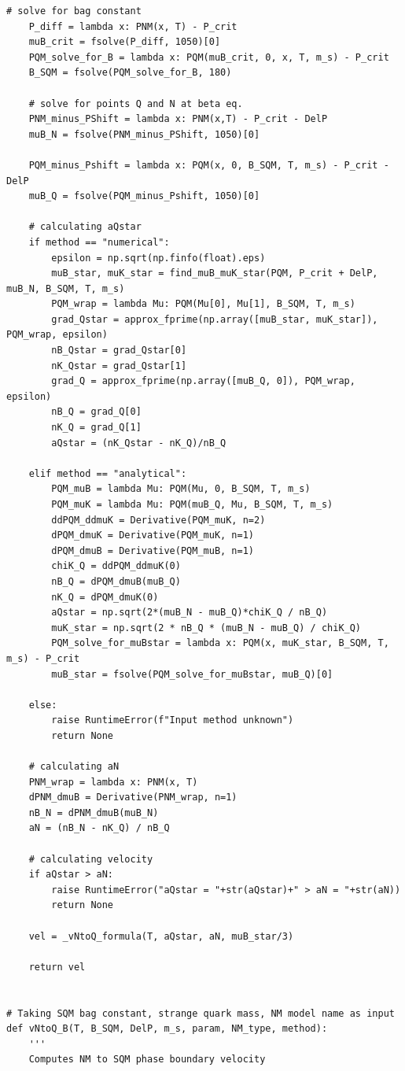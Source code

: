 \documentclass[12pt]{article}
\begin{document}
\begin{lstlisting}[style=mypython]
    # solve for bag constant
    P_diff = lambda x: PNM(x, T) - P_crit
    muB_crit = fsolve(P_diff, 1050)[0]
    PQM_solve_for_B = lambda x: PQM(muB_crit, 0, x, T, m_s) - P_crit
    B_SQM = fsolve(PQM_solve_for_B, 180)

    # solve for points Q and N at beta eq.
    PNM_minus_PShift = lambda x: PNM(x,T) - P_crit - DelP
    muB_N = fsolve(PNM_minus_PShift, 1050)[0]

    PQM_minus_Pshift = lambda x: PQM(x, 0, B_SQM, T, m_s) - P_crit - DelP
    muB_Q = fsolve(PQM_minus_Pshift, 1050)[0]

    # calculating aQstar
    if method == "numerical":
        epsilon = np.sqrt(np.finfo(float).eps)
        muB_star, muK_star = find_muB_muK_star(PQM, P_crit + DelP, muB_N, B_SQM, T, m_s)
        PQM_wrap = lambda Mu: PQM(Mu[0], Mu[1], B_SQM, T, m_s)
        grad_Qstar = approx_fprime(np.array([muB_star, muK_star]), PQM_wrap, epsilon)
        nB_Qstar = grad_Qstar[0]
        nK_Qstar = grad_Qstar[1]
        grad_Q = approx_fprime(np.array([muB_Q, 0]), PQM_wrap, epsilon)
        nB_Q = grad_Q[0]
        nK_Q = grad_Q[1]
        aQstar = (nK_Qstar - nK_Q)/nB_Q  
 
    elif method == "analytical":
        PQM_muB = lambda Mu: PQM(Mu, 0, B_SQM, T, m_s)
        PQM_muK = lambda Mu: PQM(muB_Q, Mu, B_SQM, T, m_s)
        ddPQM_ddmuK = Derivative(PQM_muK, n=2)
        dPQM_dmuK = Derivative(PQM_muK, n=1)
        dPQM_dmuB = Derivative(PQM_muB, n=1)
        chiK_Q = ddPQM_ddmuK(0)
        nB_Q = dPQM_dmuB(muB_Q)
        nK_Q = dPQM_dmuK(0)
        aQstar = np.sqrt(2*(muB_N - muB_Q)*chiK_Q / nB_Q)
        muK_star = np.sqrt(2 * nB_Q * (muB_N - muB_Q) / chiK_Q)
        PQM_solve_for_muBstar = lambda x: PQM(x, muK_star, B_SQM, T, m_s) - P_crit
        muB_star = fsolve(PQM_solve_for_muBstar, muB_Q)[0]

    else:
        raise RuntimeError(f"Input method unknown")
        return None

    # calculating aN
    PNM_wrap = lambda x: PNM(x, T)
    dPNM_dmuB = Derivative(PNM_wrap, n=1)
    nB_N = dPNM_dmuB(muB_N)
    aN = (nB_N - nK_Q) / nB_Q   

    # calculating velocity
    if aQstar > aN:
        raise RuntimeError("aQstar = "+str(aQstar)+" > aN = "+str(aN))
        return None

    vel = _vNtoQ_formula(T, aQstar, aN, muB_star/3)

    return vel


# Taking SQM bag constant, strange quark mass, NM model name as input
def vNtoQ_B(T, B_SQM, DelP, m_s, param, NM_type, method):
    '''
    Computes NM to SQM phase boundary velocity 


\end{lstlisting}
\end{document}
